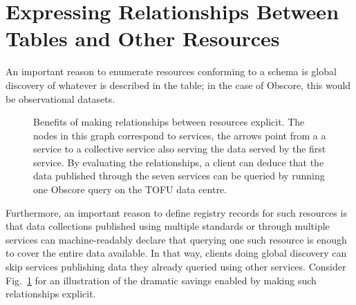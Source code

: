 \documentclass[11pt,a4paper]{ivoa}
\begin{document}
\section{Expressing Relationships Between Tables and Other Resources}
\label{sect:rels}

An important reason to enumerate resources conforming to a schema is
global discovery of whatever is described in the table; in the case of
Obscore, this would be observational datasets.

\begin{figure}

\caption{Benefits of making relationships between resources explicit.
The nodes in this graph correspond to services, the arrows point from a
a service to a collective service also serving the data served by the
first service.  By evaluating the relationships, a
client can deduce that the data published through the seven services
can be queried by running one Obscore query on the TOFU data
centre.}
\label{fig:rel-sketch}
\end{figure}

Furthermore, an important reason to define
registry records for such resources is
that data collections published using multiple standards or through
multiple services can
machine-readably declare that querying one such resource is enough to
cover the entire data available.  In that way, clients
doing global discovery can skip services publishing data they already
queried using other services.  Consider Fig.~\ref{fig:rel-sketch} for an
illustration of the dramatic savings enabled by making such
relationships explicit.
\end{document}
